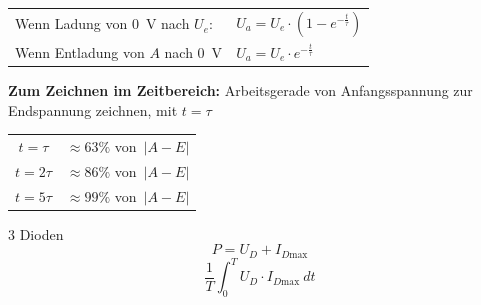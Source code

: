 \documentclass[a5paper, 12pt, twoside]{scrartcl}
\begin{document}
\begin{center}
  \begin{tabular}{ll}
    \toprule
    Wenn Ladung von \SI{0}{\volt} nach \(U_e\): & \(U_a = U_e \cdot (1 - e^{-\frac{t}{\tau}})\)\\
    Wenn Entladung von \(A\) nach \SI{0}{\volt} & \(U_a = U_e \cdot e^{-\frac{t}{\tau}}\)\\
    \bottomrule
  \end{tabular}
\end{center}

\textbf{Zum Zeichnen im Zeitbereich:} Arbeitsgerade von Anfangsspannung zur Endspannung zeichnen, mit \(t = \tau\)



\begin{table}[H]
  \centering
  \begin{tabular}{cc}
    \toprule
    \(t=\tau\) & \(\approx 63\%\) von\ \(|A-E|\)\\
    \(t=2\tau\) & \(\approx 86\%\) von\ \(|A-E|\)\\
    \(t=5\tau\) & \(\approx 99\%\) von\ \(|A-E|\)\\
    \bottomrule
  \end{tabular}
\end{table}

{\Large 3 Dioden}\\[1em]
\[P = U_D + I_{D\text{max}}\]
\[\frac{1}{T} \int_0^T U_D \cdot I_{D\text{max}}\ dt\]
\end{document}

